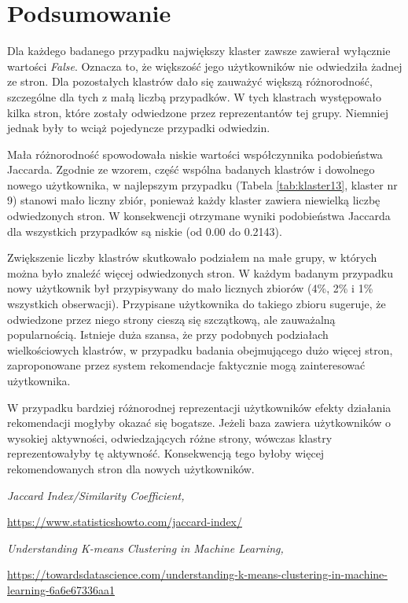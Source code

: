 \documentclass{classrep}
\begin{document}
\newpage
\section{Podsumowanie}

Dla każdego badanego przypadku największy klaster zawsze zawierał wyłącznie wartości \textit{False}. Oznacza to, że większość jego  użytkowników nie odwiedziła żadnej ze stron. Dla pozostałych klastrów dało się zauważyć większą różnorodność, szczególne dla tych z małą liczbą przypadków. W tych klastrach występowało kilka stron, które zostały odwiedzone przez reprezentantów tej grupy. Niemniej jednak były to wciąż pojedyncze przypadki odwiedzin. 

Mała różnorodność spowodowała niskie wartości współczynnika podobieństwa Jaccarda. Zgodnie ze wzorem, część wspólna badanych klastrów i dowolnego nowego użytkownika, w najlepszym przypadku (Tabela \ref{tab:klaster13}, klaster nr 9) stanowi mało liczny zbiór, ponieważ każdy klaster zawiera niewielką liczbę odwiedzonych stron. W konsekwencji otrzymane wyniki podobieństwa Jaccarda dla wszystkich przypadków są niskie (od 0.00 do 0.2143).

Zwiększenie liczby klastrów skutkowało podziałem na małe grupy, w których można było znaleźć więcej odwiedzonych stron. W każdym badanym przypadku nowy użytkownik był przypisywany do mało licznych zbiorów (4\%, 2\% i 1\% wszystkich obserwacji). Przypisane użytkownika do takiego zbioru sugeruje, że odwiedzone przez niego strony cieszą się szczątkową, ale zauważalną popularnością. Istnieje duża szansa, że przy podobnych podziałach wielkościowych klastrów, w przypadku badania obejmującego dużo więcej stron, zaproponowane przez system rekomendacje faktycznie mogą zainteresować użytkownika.

W przypadku bardziej różnorodnej reprezentacji użytkowników efekty działania rekomendacji mogłyby okazać się bogatsze. Jeżeli baza zawiera użytkowników o wysokiej aktywności, odwiedzających różne strony, wówczas klastry reprezentowałyby tę aktywność. Konsekwencją tego byłoby więcej  rekomendowanych stron dla nowych użytkowników.

\newpage
\begin{thebibliography}{}

    \textsl{Jaccard Index/Similarity Coefficient, }
    \author{Stephanie Glen,}
    \url{ https://www.statisticshowto.com/jaccard-index/}
    \text{ [dostęp: 02.12.2016]}
    
    \textsl{Understanding K-means Clustering in Machine Learning, }
    \author{Dr. Michael J. Garbade,}
    \url{https://towardsdatascience.com/understanding-k-means-clustering-in-machine-learning-6a6e67336aa1}
    \text{ [dostęp: 12.09.2018]}
    
\end{thebibliography}
\end{document}
